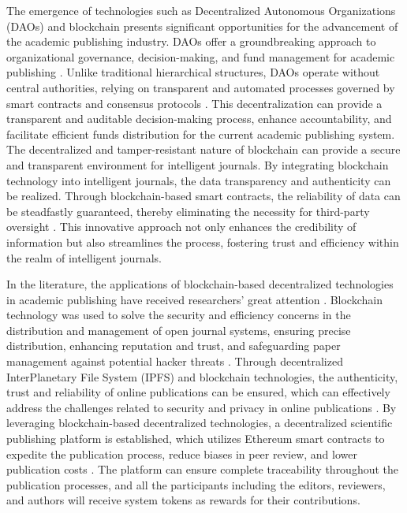 \documentclass[lettersize,journal]{IEEEtran}
\begin{document}
The emergence of technologies such as Decentralized Autonomous Organizations (DAOs) \cite{buterin2014next} and blockchain \cite{swan2015blockchain,9093840} presents significant opportunities for the advancement of the academic publishing industry. DAOs offer a groundbreaking approach to organizational governance, decision-making, and fund management for academic publishing \cite{wang2019decentralized}. Unlike traditional hierarchical structures, DAOs operate without central authorities, relying on transparent and automated processes governed by smart contracts and consensus protocols \cite{kaal2021decentralized}. This decentralization can provide a transparent and auditable decision-making process, enhance accountability, and facilitate efficient funds distribution for the current academic publishing system. The decentralized and tamper-resistant nature of blockchain can provide a secure and transparent environment for intelligent journals. By integrating blockchain technology into intelligent journals, the data transparency and authenticity can be realized. Through blockchain-based smart contracts, the reliability of data can be steadfastly guaranteed, thereby eliminating the necessity for third-party oversight \cite{mougayar2016business}. This innovative approach not only enhances the credibility of information but also streamlines the process, fostering trust and efficiency within the realm of intelligent journals.

In the literature, the applications of blockchain-based decentralized technologies in academic publishing have received researchers' great attention \cite{8756390}. Blockchain technology was used to solve the security and efficiency concerns in the distribution and management of open journal systems, ensuring precise distribution, enhancing reputation and trust, and safeguarding paper management against potential hacker threats \cite{agustin2020blockchain}. Through decentralized InterPlanetary File System (IPFS) and blockchain technologies, the authenticity, trust and reliability of online publications can be ensured, which can effectively address the challenges related to security and privacy in online publications \cite{nizamuddin2018ipfs}. By leveraging blockchain-based decentralized technologies, a decentralized scientific publishing platform is established, which utilizes Ethereum smart contracts to expedite the publication process, reduce biases in peer review, and lower publication costs \cite{becstacs2023novel}. The platform can ensure complete traceability throughout the publication processes, and all the participants including the editors, reviewers, and authors will receive system tokens as rewards for their contributions.
\end{document}
